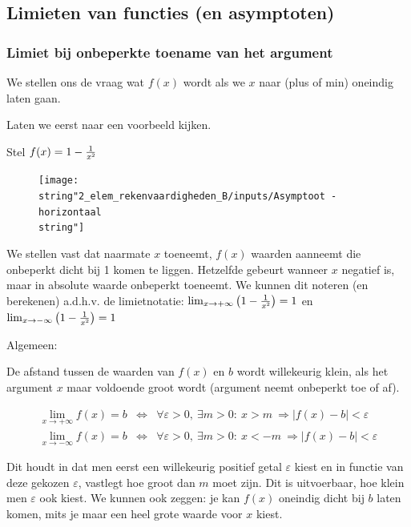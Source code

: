 \subsection{Limieten van functies (en asymptoten)}


\subsubsection{Limiet bij onbeperkte toename van het argument}

We stellen ons de vraag wat $f(x)$ wordt als we $x$ naar (plus of
min) oneindig laten gaan.

Laten we eerst naar een voorbeeld kijken. 
\begin{voorbeeld}
Stel $f(x)= 1-\frac{1}{x\text{\texttwosuperior}}$

\begin{figure}[h]
\centering{}\texttt{[image: \\string"2\_elem\_rekenvaardigheden\_B/inputs/Asymptoot - horizontaal\\string"]} 
\end{figure}


We stellen vast dat naarmate $x$ toeneemt, $f(x)$ waarden
aanneemt die onbeperkt dicht bij 1 komen te liggen. Hetzelfde gebeurt
wanneer $x$ negatief is, maar in absolute waarde onbeperkt toeneemt.
We kunnen dit noteren (en berekenen) a.d.h.v. de limietnotatie: $\lim_{x\to+\infty}\left(1-\frac{1}{x\text{\texttwosuperior}}\right)=1$
en $\lim_{x\to-\infty}\left(1-\frac{1}{x\text{\texttwosuperior}}\right)=1$
\end{voorbeeld}

Algemeen:

De afstand tussen de waarden van $f(x)$ en $b$ wordt willekeurig
klein, als het argument $x$ maar voldoende groot wordt (argument
neemt onbeperkt toe of af).


\begin{eqnarray*}
 \lim_{x\to+\infty}f(x)=b & \Leftrightarrow & \forall\varepsilon>0,\:\exists m>0:\:x>m\:\Rightarrow\left|f(x)-b\right|<\varepsilon\\
 \lim_{x\to-\infty}f(x)=b & \Leftrightarrow & \forall\varepsilon>0,\:\exists m>0:\:x<-m\:\Rightarrow\left|f(x)-b\right|<\varepsilon
\end{eqnarray*}

Dit houdt in dat men eerst een willekeurig positief getal $\varepsilon$
kiest en in functie van deze gekozen $\varepsilon$, vastlegt hoe
groot dan $m$ moet zijn. Dit is uitvoerbaar, hoe klein men $\varepsilon$
ook kiest. We kunnen ook zeggen: je kan $f(x)$ oneindig dicht bij
$b$ laten komen, mits je maar een heel grote waarde voor $x$ kiest.

